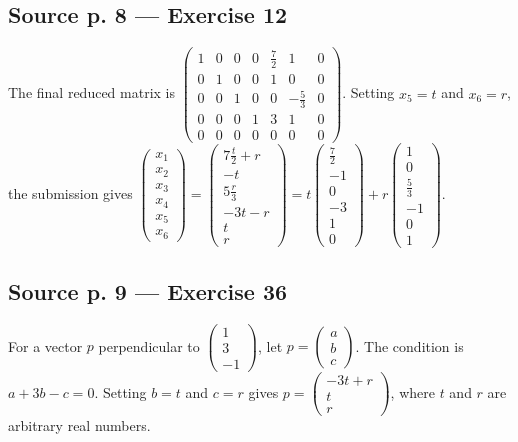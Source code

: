 \subsection{Source p. 8 --- Exercise 12}

The final reduced matrix is \(\begin{pmatrix}
1 & 0 & 0 & 0 & \frac{7}{2} & 1 & 0 \\
0 & 1 & 0 & 0 & 1 & 0 & 0 \\
0 & 0 & 1 & 0 & 0 & {- \frac{5}{3}} & 0 \\
0 & 0 & 0 & 1 & 3 & 1 & 0 \\
0 & 0 & 0 & 0 & 0 & 0 & 0
\end{pmatrix}\). Setting \(x_{5} = t\) and \(x_{6} = r\), the submission gives \(\begin{pmatrix}
x_{1} \\
x_{2} \\
x_{3} \\
x_{4} \\
x_{5} \\
x_{6}
\end{pmatrix} = \begin{pmatrix}
{7\frac{t}{2} + r} \\
{- t} \\
{5\frac{r}{3}} \\
{- 3t - r} \\
t \\
r
\end{pmatrix} = t\begin{pmatrix}
\frac{7}{2} \\
{- 1} \\
0 \\
{- 3} \\
1 \\
0
\end{pmatrix} + r\begin{pmatrix}
1 \\
0 \\
\frac{5}{3} \\
{- 1} \\
0 \\
1
\end{pmatrix}\).

\subsection{Source p. 9 --- Exercise 36}

For a vector \(p\) perpendicular to \(\begin{pmatrix}
1 \\
3 \\
{- 1}
\end{pmatrix}\), let \(p = \begin{pmatrix}
a \\
b \\
c
\end{pmatrix}\). The condition is \(a + 3b - c = 0\). Setting \(b = t\) and \(c = r\) gives \(p = \begin{pmatrix}
{- 3t + r} \\
t \\
r
\end{pmatrix}\), where \(t\) and \(r\) are arbitrary real numbers.

